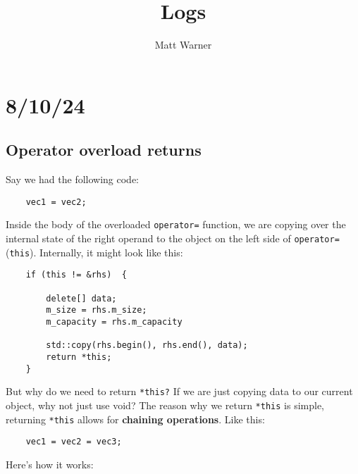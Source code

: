 \documentclass{report}
\title{\Huge{Logs}}
\author{\huge{Matt Warner}}
\date{\huge{}}
\begin{document}
    \maketitle
    \section{8/10/24}
    \subsection{Operator overload returns} 
    Say we had the following code:
    \begin{verbatim}
    vec1 = vec2;
    \end{verbatim}
    \noindent Inside the body of the overloaded \texttt{operator=} function, we are copying over the internal state of the right operand to the object on the left side of \texttt{operator=} (\texttt{this}). Internally, it might look like this:
    \begin{verbatim}
    if (this != &rhs)  {

        delete[] data;
        m_size = rhs.m_size;
        m_capacity = rhs.m_capacity

        std::copy(rhs.begin(), rhs.end(), data);
        return *this;
    }
    \end{verbatim}
    But why do we need to return \texttt{*this?} If we are just copying data to our current object, why not just use void?
    \bigbreak \noindent
    The reason why we return \texttt{*this} is simple, returning \texttt{*this} allows for \textbf{chaining operations}. Like this:
    \begin{verbatim}
    vec1 = vec2 = vec3;
    \end{verbatim}
Here’s how it works:
\end{document}
